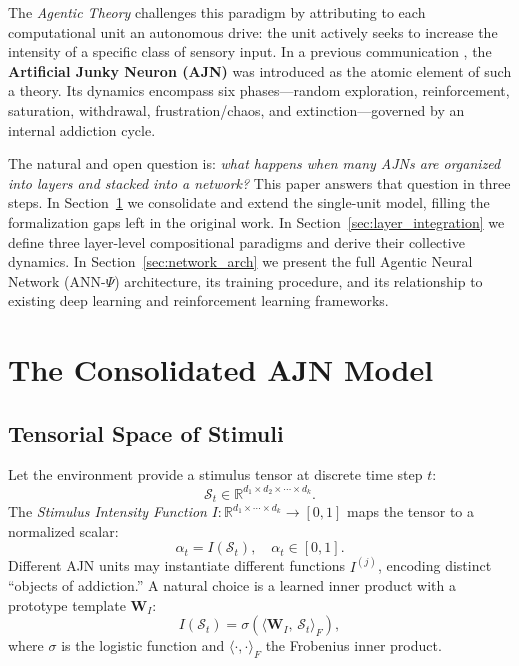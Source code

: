 \documentclass[12pt,a4paper]{article}
\begin{document}
The \textit{Agentic Theory} challenges this paradigm by attributing to each
computational unit an autonomous drive: the unit actively seeks to increase the
intensity of a specific class of sensory input. In a previous communication
\cite{tapiador2024ajn}, the \textbf{Artificial Junky Neuron (AJN)} was introduced
as the atomic element of such a theory. Its dynamics encompass six phases---random
exploration, reinforcement, saturation, withdrawal, frustration/chaos, and
extinction---governed by an internal addiction cycle.

The natural and open question is: \textit{what happens when many AJNs are
organized into layers and stacked into a network?} This paper answers that question
in three steps. In Section~\ref{sec:ajn_consolidated} we consolidate and extend
the single-unit model, filling the formalization gaps left in the original work.
In Section~\ref{sec:layer_integration} we define three layer-level compositional
paradigms and derive their collective dynamics. In Section~\ref{sec:network_arch}
we present the full Agentic Neural Network (ANN-$\Psi$) architecture, its training
procedure, and its relationship to existing deep learning and reinforcement learning
frameworks.

\section{The Consolidated AJN Model}
\label{sec:ajn_consolidated}

\subsection{Tensorial Space of Stimuli}

Let the environment provide a stimulus tensor at discrete time step $t$:
\[
\mathcal{S}_t \in \mathbb{R}^{d_1 \times d_2 \times \cdots \times d_k}.
\]
The \textit{Stimulus Intensity Function} $I: \mathbb{R}^{d_1 \times \cdots \times d_k}
\to [0,1]$ maps the tensor to a normalized scalar:
\[
\alpha_t = I(\mathcal{S}_t), \quad \alpha_t \in [0,1].
\]
Different AJN units may instantiate different functions $I^{(j)}$, encoding distinct
``objects of addiction.'' A natural choice is a learned inner product with a
prototype template $\mathbf{W}_I$:
\[
I(\mathcal{S}_t) = \sigma\!\left(\langle \mathbf{W}_I,\, \mathcal{S}_t \rangle_F\right),
\]
where $\sigma$ is the logistic function and $\langle \cdot,\cdot\rangle_F$ the
Frobenius inner product.
\end{document}
